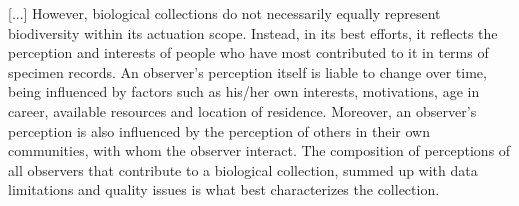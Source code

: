 [...] 
However, biological collections do not necessarily equally represent biodiversity within its actuation scope.
Instead, in its best efforts, it reflects the perception and interests of people who have most contributed to it in terms of specimen records.
An observer's perception itself is liable to change over time, being influenced by factors such as his/her own interests, motivations, age in career, available resources and location of residence.
Moreover, an observer's perception is also influenced by the perception of others in their own communities, with whom the observer interact.
The composition of perceptions of all observers that contribute to a biological collection, summed up with data limitations and quality issues is what best characterizes the collection.







